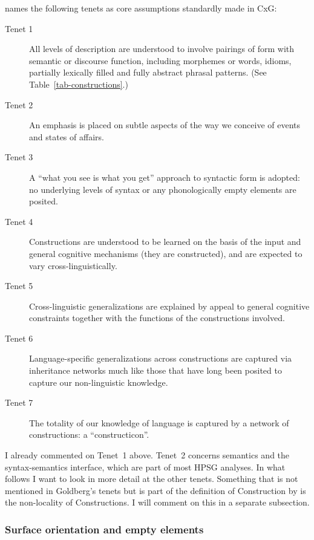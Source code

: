 \documentclass[output=paper
	        ,collection
	        ,collectionchapter
 	        ,biblatex
                ,babelshorthands
                ,newtxmath
                ,draftmode
                ,colorlinks, citecolor=brown
]{langscibook}
\begin{document}
 \citet{Goldberg2003b} names the following tenets as core assumptions standardly made in CxG:
\begin{description}
\item[Tenet 1] All levels of description are understood to involve pairings of form with semantic or discourse function, including morphemes or words, idioms, partially lexically filled and fully abstract phrasal patterns. (See Table~\ref{tab-constructions}.)
\item[Tenet 2] An emphasis is placed on subtle aspects of the way we conceive of events and states of
affairs.
\item[Tenet 3] A ``what you see is what you get'' approach to syntactic form is adopted: no underlying levels
  of syntax or any phonologically empty elements are posited. 
\item[Tenet 4] Constructions are understood to be learned on the basis of the input and general cognitive mechanisms (they are constructed), and are expected to vary cross-linguistically.
\item[Tenet 5] Cross-linguistic generalizations are explained by appeal to general cognitive constraints together with the functions of the constructions involved.
\item[Tenet 6] Language-specific generalizations across constructions are captured via inheritance networks much like those that have long been posited to capture our non-linguistic knowledge.
\item[Tenet 7] The totality of our knowledge of language is captured by a network of constructions: a ``constructicon''.
\end{description}

I already commented on Tenet~1 above. Tenet~2 concerns semantics and the syntax-semantics interface,
which are part of most HPSG analyses. In what follows I want to look in more detail at the other
tenets. Something that is not mentioned in Goldberg's tenets but is part of the definition of
Construction by \citet[]{FKoC88a} is the non-locality of Constructions. I will comment on
this in a separate subsection.

\subsubsection{Surface orientation and empty elements}
\end{document}
